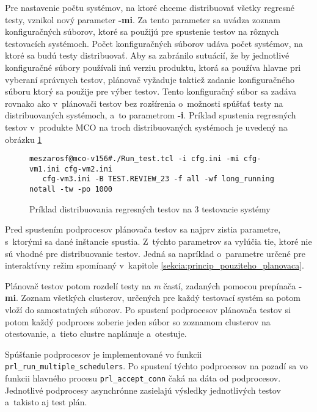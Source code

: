 Pre nastavenie počtu systémov, na ktoré chceme distribuovať všetky regresné testy, vznikol nový parameter \textbf{-mi}.
Za tento parameter sa uvádza zoznam konfiguračných súborov, ktoré sa použijú pre spustenie testov na rôznych
testovacích systémoch. Počet konfiguračných súborov udáva počet systémov, na ktoré sa budú testy distribuovať.
Aby sa zabránilo sutuácií, že by jednotlivé konfiguračné súbory používali inú verziu produktu, ktorá sa
používa hlavne pri vyberaní správnych testov, plánovač vyžaduje taktiež zadanie konfiguračného súboru ktorý
sa použije pre výber testov. Tento konfiguračný súbor sa zadáva rovnako ako v~plánovači testov bez rozšírenia
o~možnosti spúšťať testy na distribuovaných systémoch, a~to parametrom \textbf{-i}.
Príklad spustenia regresných testov v~produkte MCO na troch distribuovaných systémoch je uvedený na obrázku 
\ref{obrazok:priklad_spustania_testov_paralelne}

\begin{figure}[h]
\begin{lstlisting}
meszarosf@mco-v156#./Run_test.tcl -i cfg.ini -mi cfg-vm1.ini cfg-vm2.ini 
   cfg-vm3.ini -B TEST.REVIEW_23 -f all -wf long_running notall -tw -po 1000
\end{lstlisting}
\caption{Príklad distribuovania regresných testov na 3 testovacie systémy}
\label{obrazok:priklad_spustania_testov_paralelne}
\end{figure}

Pred spustením podprocesov plánovača testov sa najprv zistia parametre, s~ktorými sa dané 
inštancie spustia. Z~týchto parametrov sa vylúčia tie, ktoré nie sú vhodné pre
distribuovanie testov. Jedná sa napríklad o~parametre určené pre interaktívny režim spomínaný v~kapitole 
\ref{sekcia:princip_pouziteho_planovaca}.

Plánovač testov potom rozdelí testy na \textit{m} častí, zadaných pomocou prepínača \textbf{-mi}.
Zoznam všetkých clusterov, určených pre každý testovací systém sa potom vloží do samostatných súborov.
Po spustení podprocesov plánovača testov si potom každý podproces zoberie jeden súbor so zoznamom 
clusterov na otestovanie, a~tieto clustre naplánuje a~otestuje.

Spúšťanie podprocesov je implementované vo funkcii \texttt{prl\_run\_multiple\_schedulers}.
Po spustení týchto podprocesov na pozadí sa vo funkcii hlavného procesu \texttt{prl\_accept\_conn} čaká na dáta od podprocesov.
Jednotlivé podprocesy asynchrónne zasielajú výsledky jednotlivých testov a~takisto aj test plán.

